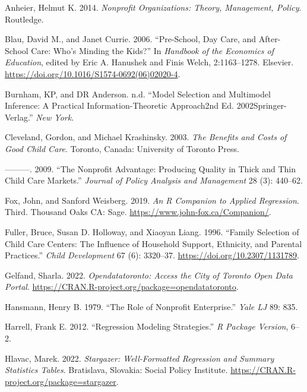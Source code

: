 \documentclass[
  letterpaper,
  DIV=11,
  numbers=noendperiod]{scrartcl}
\newlength{\cslhangindent}
\newenvironment{CSLReferences}[2] %
 {\begin{list}{}{%
  \setlength{\itemindent}{0pt}
  \setlength{\leftmargin}{0pt}
  \setlength{\parsep}{0pt}
  \ifodd #1
   \setlength{\leftmargin}{\cslhangindent}
   \setlength{\itemindent}{-1\cslhangindent}
  \fi
  \setlength{\itemsep}{#2\baselineskip}}}
 {\end{list}}
\begin{document}
\label{refs}
\begin{CSLReferences}{1}{0}
Anheier, Helmut K. 2014. \emph{Nonprofit Organizations: Theory,
Management, Policy}. Routledge.

Blau, David M., and Janet Currie. 2006. {``Pre-School, Day Care, and
After-School Care: Who's Minding the Kids?''} In \emph{Handbook of the
Economics of Education}, edited by Eric A. Hanushek and Finis Welch,
2:1163--1278. Elsevier.
\url{https://doi.org/10.1016/S1574-0692(06)02020-4}.

Burnham, KP, and DR Anderson. n.d. {``Model Selection and Multimodel
Inference: A Practical Information-Theoretic Approach2nd Ed.
2002Springer-Verlag.''} \emph{New York}.

Cleveland, Gordon, and Michael Krashinsky. 2003. \emph{The Benefits and
Costs of Good Child Care}. Toronto, Canada: University of Toronto Press.

---------. 2009. {``The Nonprofit Advantage: Producing Quality in Thick
and Thin Child Care Markets.''} \emph{Journal of Policy Analysis and
Management} 28 (3): 440--62.

Fox, John, and Sanford Weisberg. 2019. \emph{An {R} Companion to Applied
Regression}. Third. Thousand Oaks {CA}: Sage.
\url{https://www.john-fox.ca/Companion/}.

Fuller, Bruce, Susan D. Holloway, and Xiaoyan Liang. 1996. {``Family
Selection of Child Care Centers: The Influence of Household Support,
Ethnicity, and Parental Practices.''} \emph{Child Development} 67 (6):
3320--37. \url{https://doi.org/10.2307/1131789}.

Gelfand, Sharla. 2022. \emph{Opendatatoronto: Access the City of Toronto
Open Data Portal}.
\url{https://CRAN.R-project.org/package=opendatatoronto}.

Hansmann, Henry B. 1979. {``The Role of Nonprofit Enterprise.''}
\emph{Yale LJ} 89: 835.

Harrell, Frank E. 2012. {``Regression Modeling Strategies.''} \emph{R
Package Version}, 6--2.

Hlavac, Marek. 2022. \emph{Stargazer: Well-Formatted Regression and
Summary Statistics Tables}. Bratislava, Slovakia: Social Policy
Institute. \url{https://CRAN.R-project.org/package=stargazer}.


\end{CSLReferences}
\end{document}

